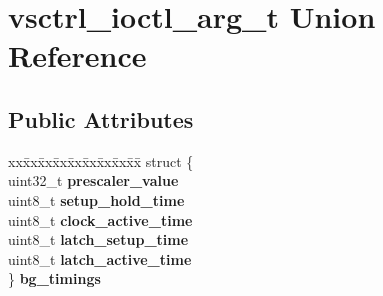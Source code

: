\hypertarget{unionvsctrl__ioctl__arg__t}{\section{vsctrl\-\_\-ioctl\-\_\-arg\-\_\-t Union Reference}
\label{unionvsctrl__ioctl__arg__t}
}
\subsection*{Public Attributes}
\begin{DoxyCompactItemize}
\item 
\hypertarget{unionvsctrl__ioctl__arg__t_a964ccf1f18660451105f3f4d11f3b350}{\begin{tabbing}
xx\=xx\=xx\=xx\=xx\=xx\=xx\=xx\=xx\=\kill
struct \{\\
\hypertarget{structvsctrl__ioctl__arg__t_1_1@0_acca01b2b83df159bd627baedbcae7088}{\>uint8\_t {\bfseries addr}\\
\hypertarget{structvsctrl__ioctl__arg__t_1_1@0_a830f110327c3019b4605d9fdf431ba2b}{\>char {\bfseries rw}\\
\hypertarget{structvsctrl__ioctl__arg__t_1_1@0_a32e4d0eda06a0f39312403cb4a38a522}{\>uint32\_t {\bfseries data}\\
\} {\bfseries regs}}\label{unionvsctrl__ioctl__arg__t_a964ccf1f18660451105f3f4d11f3b350}
\\

\end{tabbing}\item 
\hypertarget{unionvsctrl__ioctl__arg__t_a216ca18ed652e07b53e2b62ab1f15c62}{\begin{tabbing}
xx\=xx\=xx\=xx\=xx\=xx\=xx\=xx\=xx\=\kill
struct \{\\
\hypertarget{structvsctrl__ioctl__arg__t_1_1@1_a65ff1a40830e9dfc9a1aa152b7ff7921}{\>uint32\_t {\bfseries prescaler\_value}\\
\hypertarget{structvsctrl__ioctl__arg__t_1_1@1_ac8836d90d5ceb208f0ec55b2ad5e5711}{\>uint8\_t {\bfseries setup\_hold\_time}\\
\hypertarget{structvsctrl__ioctl__arg__t_1_1@1_aaa1204f9bca9864852e0f939b37e2fac}{\>uint8\_t {\bfseries clock\_active\_time}\\
\hypertarget{structvsctrl__ioctl__arg__t_1_1@1_ac47478b97045c4b2901fddd773ef5861}{\>uint8\_t {\bfseries latch\_setup\_time}\\
\hypertarget{structvsctrl__ioctl__arg__t_1_1@1_a480b1ee0443a490f859746d18b448529}{\>uint8\_t {\bfseries latch\_active\_time}\\
\} {\bfseries bg\_timings}}\label{unionvsctrl__ioctl__arg__t_a216ca18ed652e07b53e2b62ab1f15c62}
\\

}}}}
\end{tabbing}}}
\end{DoxyCompactItemize}
